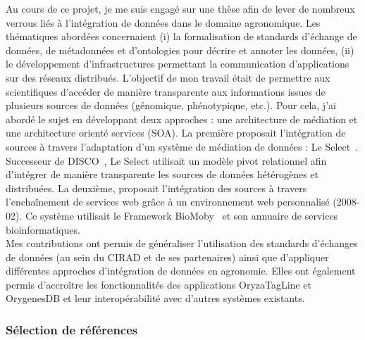 Au cours de ce projet, je me suis engagé sur une thèse afin de lever de nombreux verrous liés à l’intégration de données dans le domaine agronomique. Les thématiques abordées concernaient (i) la formalisation de standards d’échange de données, de métadonnées et d’ontologies pour décrire et annoter les données, (ii) le développement d’infrastructures permettant la communication d’applications sur des réseaux distribués. L’objectif de mon travail était de permettre aux scientifiques d'accéder de manière transparente aux informations issues de plusieurs sources de données (génomique, phénotypique, etc.).  Pour cela, j’ai abordé le sujet en développant deux approches : une architecture de médiation et une architecture orienté services (SOA).  La première proposait l’intégration de sources à travers l'adaptation d'un système de médiation de données : Le Select~\cite{manolescu2002}. Successeur de DISCO~\cite{Tomasic1998}, Le Select utilisait un modèle pivot relationnel afin d’intégrer de manière transparente les sources de données hétérogènes et distribuées. La deuxième, proposait l’intégration des sources à travers l’enchaînement de services web grâce à un environnement web personnalisé (2008-02). Ce système utilisait le Framework BioMoby~\cite{Wilkinson2002a,Wilkinson2005a}  et son annuaire de services bioinformatiques. \\

Mes contributions ont permis de généraliser l’utilisation des standards d’échanges de données (au sein du CIRAD et de ses partenaires) ainsi que d’appliquer différentes approches d’intégration de données en agronomie. Elles ont également permis d’accroître les fonctionnalités des applications OryzaTagLine et OrygenesDB et leur interopérabilité avec d’autres systèmes existants.

\subsubsection*{Sélection de références}

